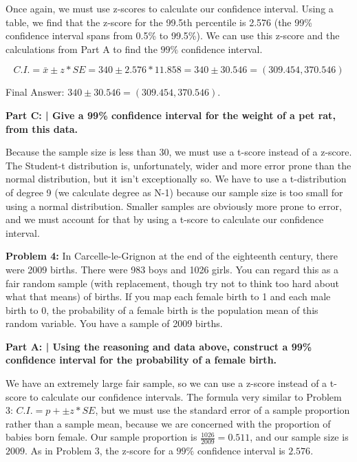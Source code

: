 \documentclass{article}
\begin{document}
 Once again, we must use z-scores to calculate our confidence interval. Using a table, we find that the z-score for the 99.5th percentile is 2.576 (the 99\% confidence interval spans from 0.5\% to 99.5\%). We can use this z-score and the calculations from Part A to find the $99\%$ confidence interval.
 
 \[C.I. = \bar{x} \pm z*SE = 340 \pm 2.576*11.858 = 340 \pm 30.546 = (309.454, 370.546) \]
 
 Final Answer: $340 \pm 30.546 = (309.454, 370.546)$.\newline
 
 \textbf{Part C: | Give a 99\% confidence interval for the weight of a pet rat, from this data.}\newline
 
 Because the sample size is less than 30, we must use a t-score instead of a z-score. The Student-t distribution is, unfortunately, wider and more error prone than the normal distribution, but it isn't exceptionally so. We have to use a t-distribution of degree 9 (we calculate degree as N-1) because our sample size is too small for using a normal distribution. Smaller samples are obviously more prone to error, and we must account for that by using a t-score to calculate our confidence interval.
 
 \newpage
 
 \begin{center}
      \Large\textbf{Problem 4:} In Carcelle-le-Grignon at the end of the eighteenth century, there were 2009 births. There were 983 boys and 1026 girls. You can regard this as a fair random sample (with replacement, though try not to think too hard about what that means) of births. If you map each female birth to 1 and each male birth to 0, the probability of a female birth is the population mean of this random variable. You have a sample of 2009 births.\par
 \end{center}
 
 \textbf{Part A: | Using the reasoning and data above, construct a 99\% confidence interval for the probability of a female birth.}\newline
 
 We have an extremely large fair sample, so we can use a z-score instead of a t-score to calculate our confidence intervals. The formula very similar to Problem 3: $C.I. = p + \pm z*SE$, but we must use the standard error of a sample proportion rather than a sample mean, because we are concerned with the proportion of babies born female. Our sample proportion is $\frac{1026}{2009} = 0.511$, and our sample size is $2009$. As in Problem 3, the z-score for a $99\%$ confidence interval is $2.576$.
 
\end{document}
